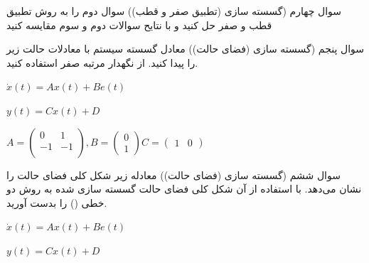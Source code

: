 \documentclass[12pt]{article}
\begin{document}
    
    \begin{problem}{سوال چهارم}
    	(گسسته سازی (تطبیق صفر و قطب)) سوال دوم را به روش تطبیق قطب و صفر حل کنید و با نتایح سوالات دوم و سوم مقایسه کنید
    	
    	
    \end{problem}
    
    \begin{problem}{سوال پنجم}
    	(گسسته سازی (فضای حالت)) معادل گسسته سیستم با معادلات حالت زیر را پیدا کنید.
    	از نگهدار مرتبه صفر استفاده کنید.
    	
    	    	\centering
    	$
    	\dot{x}(t)=Ax(t)+Be(t) 
    	$
    	
    	$
    	y(t)=Cx(t)+D 
    	$
    	
    	$
    		 A=\left( \begin{matrix}
    			0 & 1 \\  
    			-1 & -1 \\ 
    		\end{matrix} \right),B=\left( \begin{matrix}
    			0 \\
    			1  
    		\end{matrix} \right)  
    		 C=\left( \begin{matrix}
    			1 & 0  
    		\end{matrix} \right) 
    	$
    \end{problem}
    
    \begin{problem}{سوال ششم}
    	(گسسته سازی (فضای حالت)) معادله زیر شکل کلی فضای حالت را نشان می‌دهد. با استفاده از آن شکل کلی فضای حالت گسسته سازی شده به روش دو خطی () را بدست آورید.
    
    	\centering
$
    		 \dot{x}(t)=Ax(t)+Be(t) 
$

$
    		 y(t)=Cx(t)+D 
$
    	
	
	
	\end{problem}    
    
\end{document}
